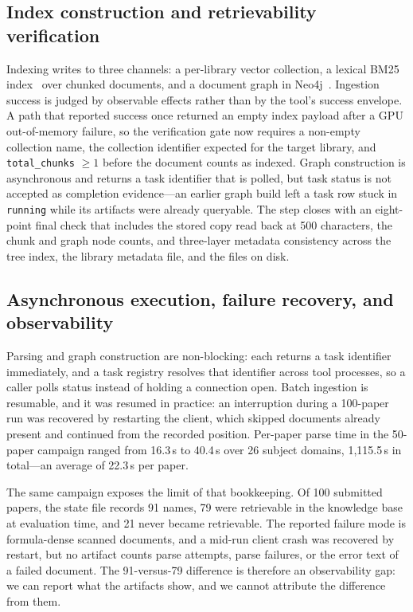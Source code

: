\subsection{Index construction and retrievability verification}

Indexing writes to three channels: a per-library vector collection, a
lexical BM25 index~\citep{bm25} over chunked documents, and a document
graph in Neo4j~\citep{neo4j}. Ingestion success is judged by observable
effects rather than by the tool's success envelope. A path that reported
success once returned an empty index payload after a GPU
out-of-memory failure, so the verification gate now requires a
non-empty collection name, the collection identifier expected for the
target library, and \texttt{total\_chunks} $\geq 1$ before the document
counts as indexed. Graph construction is asynchronous and returns a
task identifier that is polled, but task status is not accepted as
completion evidence---an earlier graph build left a task row stuck in
\texttt{running} while its artifacts were already queryable. The
step closes with an eight-point final check that includes the stored
copy read back at 500 characters, the chunk and graph node counts, and
three-layer metadata consistency across the tree index, the library
metadata file, and the files on disk.

\subsection{Asynchronous execution, failure recovery, and observability}

Parsing and graph construction are non-blocking: each returns a task
identifier immediately, and a task registry resolves that identifier
across tool processes, so a caller polls status instead of holding a
connection open. Batch ingestion is resumable, and it was resumed in
practice: an interruption during a 100-paper run was recovered by
restarting the client, which skipped documents already present and
continued from the recorded position. Per-paper parse time in the
50-paper campaign ranged from 16.3\,s to 40.4\,s over 26 subject
domains, 1{,}115.5\,s in total---an average of 22.3\,s per paper.

The same campaign exposes the limit of that bookkeeping. Of 100
submitted papers, the state file records 91 names, 79 were retrievable
in the knowledge base at evaluation time, and 21 never became
retrievable. The reported failure mode is formula-dense scanned
documents, and a mid-run client crash was recovered by restart, but no
artifact counts parse attempts, parse failures, or the error text of a
failed document. The 91-versus-79 difference is therefore an
observability gap: we can report what the artifacts show, and we cannot
attribute the difference from them.


